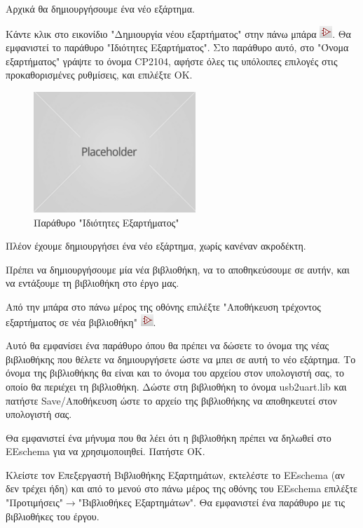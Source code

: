 \documentclass[a4paper]{article}
\begin{document}
Αρχικά θα δημιουργήσουμε ένα νέο εξάρτημα.

Κάντε κλικ στο εικονίδιο "Δημιουργία νέου εξαρτήματος" στην πάνω μπάρα \includegraphics{img/graphic.png}. Θα εμφανιστεί το παράθυρο "Ιδιότητες Εξαρτήματος". Στο παράθυρο αυτό, στο "Όνομα εξαρτήματος" γράψτε το όνομα CP2104, αφήστε όλες τις υπόλοιπες επιλογές στις προκαθορισμένες ρυθμίσεις, και επιλέξτε ΟΚ.

\begin{figure}
  \begin{center}
    \includegraphics{img/kicad-main.png}
    \caption{Παράθυρο "Ιδιότητες Εξαρτήματος"}
    \label{fig:kicad-main}
  \end{center}
\end{figure}

Πλέον έχουμε δημιουργήσει ένα νέο εξάρτημα, χωρίς κανέναν ακροδέκτη. 

Πρέπει να δημιουργήσουμε μία νέα βιβλιοθήκη, να το αποθηκεύσουμε σε αυτήν, και να εντάξουμε τη βιβλιοθήκη στο έργο μας.

Από την μπάρα στο πάνω μέρος της οθόνης επιλέξτε "Αποθήκευση τρέχοντος εξαρτήματος σε νέα βιβλιοθήκη" \includegraphics{img/graphic.png}.

Αυτό θα εμφανίσει ένα παράθυρο όπου θα πρέπει να δώσετε το όνομα της νέας βιβλιοθήκης που θέλετε να δημιουργήσετε ώστε να μπει σε αυτή το νέο εξάρτημα. Το όνομα της βιβλιοθήκης θα είναι και το όνομα του αρχείου στον υπολογιστή σας, το οποίο θα περιέχει τη βιβλιοθήκη. Δώστε στη βιβλιοθήκη το όνομα usb2uart.lib και πατήστε Save/Αποθήκευση ώστε το αρχείο της βιβλιοθήκης να αποθηκευτεί στον υπολογιστή σας. 

Θα εμφανιστεί ένα μήνυμα που θα λέει ότι η βιβλιοθήκη πρέπει να δηλωθεί στο EEschema για να χρησιμοποιηθεί. Πατήστε ΟΚ.

Κλείστε τον Επεξεργαστή Βιβλιοθήκης Εξαρτημάτων, εκτελέστε το EEschema (αν δεν τρέχει ήδη) και από το μενού στο πάνω μέρος της οθόνης του EEschema επιλέξτε "Προτιμήσεις"$\rightarrow$"Βιβλιοθήκες Εξαρτημάτων". Θα εμφανιστεί ένα παράθυρο με τις βιβλιοθήκες του έργου. 
\end{document}

